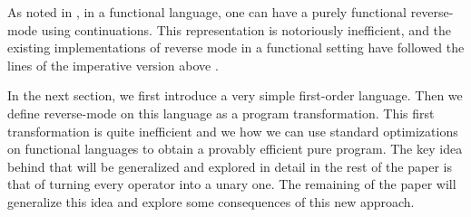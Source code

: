 As noted in \cite{pearlmutter2008reverse}, in a functional language, one can have a purely functional reverse-mode using continuations. 
This representation is notoriously inefficient, and the existing implementations of reverse mode in a functional setting have followed the lines of the imperative version above \cite{pearlmutter2008reverse, wang2018demystifying, baydin2016diffsharp}.

In the next section, we first introduce a very simple first-order language. 
Then we define reverse-mode on this language as a program transformation. 
This first transformation is quite inefficient and we how we can use standard optimizations on functional languages to obtain a provably efficient pure program.
The key idea behind that will be generalized and explored in detail in the rest of the paper is that of turning every operator into a unary one.     
The remaining of the paper will generalize this idea and explore some consequences of this new approach. 
